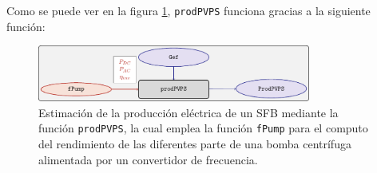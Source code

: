 Como se puede ver en la figura \ref{fig:prodpvps}, \texttt{prodPVPS} funciona gracias a la siguiente función:
\begin{figure}[!htb]
\centering
\includegraphics[keepaspectratio,width=0.8\textwidth,height=0.5\textheight]{figuras/prodpvps.pdf}
\caption{Estimación de la producción eléctrica de un SFB mediante la función \texttt{prodPVPS}, la cual emplea la función \texttt{fPump} para el computo del rendimiento de las diferentes parte de una bomba centrífuga alimentada por un convertidor de frecuencia. \label{fig:prodpvps}}
\end{figure}
